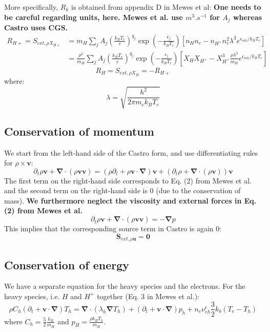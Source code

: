 \documentclass[11pt, oneside]{article}   	%
\begin{document}
More specifically, $R_k$ is obtained from appendix D in Mewes et al:
\textbf{One needs to be careful regarding units, here. Mewes et al. use $m^3.s^{-1}$ for $A_j$ whereas Castro uses CGS.}
\begin{align}
R_{H+} = S_{ext, \rho X_{H+} } &= m_H \sum_j A_j \left( \frac{k_BT_e}{e} \right)^{q_j}\exp\left( - \frac{\epsilon_j}{k_B T_e} \right)\left[ n_H n_e - n_{H^+}n_e^2 \lambda^3 e^{\epsilon_{ion}/k_BT_e} \right] \\
&= \frac{\rho^2}{m_H}\sum_j A_j \left( \frac{k_BT_e}{e} \right)^{q_j}\exp\left( - \frac{\epsilon_j}{k_B T_e} \right)\left[ X_H X_{H^+} - X_{H^+}^3 \frac{\rho \lambda^3}{m_H} e^{\epsilon_{ion}/k_BT_e} \right] 
\end{align}
\[ R_H = S_{ext, \rho X_{H} } = -R_{H+} \]
where: \[ \lambda = \sqrt{\frac{h^2}{2\pi m_e k_B T_e} } \]

\subsection{Conservation of momentum}

We start from the left-hand side of the Castro form, and use differentiating rules for $\rho \times \boldsymbol{v}$:
\[
\partial_t \rho \boldsymbol{v} + \boldsymbol{\nabla}\cdot(\rho \boldsymbol{v} \boldsymbol{v}) = (\rho\partial_t + \rho \boldsymbol{v}\cdot\boldsymbol{\nabla}) \boldsymbol{v} + (\partial_t \rho + \boldsymbol{\nabla}\cdot(\rho \boldsymbol{v} ) ) \boldsymbol{v}
\]
The first term on the right-hand side corresponds to Eq. (2) from Mewes et al. and the second term on the right-hand side is 0 (due to the conservation of mass). \textbf{We furthermore neglect the viscosity and external forces in Eq. (2) from Mewes et al.}
\[ \partial_t \rho \boldsymbol{v} + \boldsymbol{\nabla}\cdot(\rho \boldsymbol{v} \boldsymbol{v}) = -\boldsymbol{\nabla}p \]
This implies that the corresponding source term in Castro is again 0:
\[ \boldsymbol{S}_{ext,\rho\boldsymbol{u}} = \boldsymbol{0} \]

\subsection{Conservation of energy}

We have a separate equation for the heavy species and the electrons. For the heavy species, i.e. $H$ and $H^+$ together (Eq. 3 in Mewes et al.):
\[ \rho C_h (\partial_t + \boldsymbol{v}\cdot\boldsymbol{\nabla})T_h = \boldsymbol{\nabla}\cdot(\lambda_h\boldsymbol{\nabla}T_h) + (\partial_t + \boldsymbol{v}\cdot\boldsymbol{\nabla})p_h + n_e\nu_{eh}^\epsilon \frac{3}{2}k_b(T_e - T_h) \]
where $C_h = \frac{5}{2}\frac{k_B}{m_H}$ and $p_H = \frac{\rho k_B T_h}{m_H}$.
\end{document}
